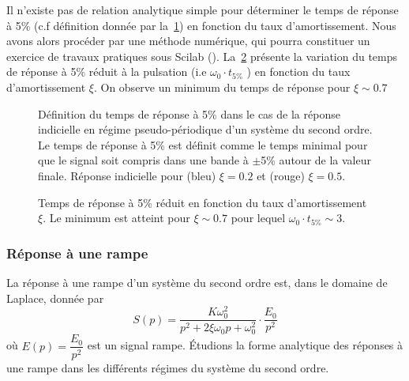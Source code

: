 Il n'existe pas de relation analytique simple pour déterminer 
le temps de réponse à 5\% (c.f définition donnée par la~\cref{fig-2nd_t5pc}) 
en fonction du taux d'amortissement. Nous avons alors procéder par une 
méthode numérique, qui pourra constituer un exercice de travaux pratiques  
sous Scilab (). 
La~\cref{fig-2nd_temps_reponse} présente la variation du temps de 
réponse à 5\% réduit à la pulsation (i.e $\omega_0\cdot t_{5\%}$ ) 
en fonction du taux d'amortissement $\xi$. On observe un minimum du 
temps de réponse pour $\xi\sim 0.7$

\begin{figure}[!h]
    \centering
    
    \caption{Définition du temps de réponse à 5\% dans le cas de la 
    réponse indicielle en régime pseudo-périodique d'un système du 
    second ordre. Le temps de réponse à 5\% est définit comme le 
    temps minimal pour que le signal soit compris dans une bande 
    à $\pm$5\% autour de la valeur finale. Réponse indicielle 
    pour (bleu) $\xi=0.2$ et (rouge) $\xi=0.5$.\label{fig-2nd_t5pc} }
\end{figure}

\begin{figure}
\centering
    
    \caption{Temps de réponse à 5\% réduit en fonction du taux 
             d'amortissement $\xi$. Le minimum est atteint pour $\xi\sim0.7$ 
             pour lequel $\omega_0\cdot t_{5\%}\sim3$.
             \label{fig-2nd_temps_reponse}}
\end{figure}

{\tikzset{external/export=false}

}

\subsubsection{Réponse à une rampe}
La réponse à une rampe d'un système du second ordre est, dans le domaine 
de Laplace, donnée par
$$
S(p)=\dfrac{K\omega_0^2}{p^2+2\xi\omega_0p+\omega_0^2}\cdot\dfrac{E_0}{p^2}
$$
où $E(p)=\dfrac{E_0}{p^2}$ est un signal rampe.
\'Etudions la forme analytique des réponses à une rampe dans les différents 
régimes du système du second ordre.

